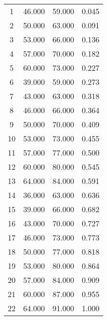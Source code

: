 % 
\begin{tabular}{cccc}
  \hline
  \hline
1 & 46.000 & 59.000 & 0.045 \\ 
  2 & 50.000 & 63.000 & 0.091 \\ 
  3 & 53.000 & 66.000 & 0.136 \\ 
  4 & 57.000 & 70.000 & 0.182 \\ 
  5 & 60.000 & 73.000 & 0.227 \\ 
  6 & 39.000 & 59.000 & 0.273 \\ 
  7 & 43.000 & 63.000 & 0.318 \\ 
  8 & 46.000 & 66.000 & 0.364 \\ 
  9 & 50.000 & 70.000 & 0.409 \\ 
  10 & 53.000 & 73.000 & 0.455 \\ 
  11 & 57.000 & 77.000 & 0.500 \\ 
  12 & 60.000 & 80.000 & 0.545 \\ 
  13 & 64.000 & 84.000 & 0.591 \\ 
  14 & 36.000 & 63.000 & 0.636 \\ 
  15 & 39.000 & 66.000 & 0.682 \\ 
  16 & 43.000 & 70.000 & 0.727 \\ 
  17 & 46.000 & 73.000 & 0.773 \\ 
  18 & 50.000 & 77.000 & 0.818 \\ 
  19 & 53.000 & 80.000 & 0.864 \\ 
  20 & 57.000 & 84.000 & 0.909 \\ 
  21 & 60.000 & 87.000 & 0.955 \\ 
  22 & 64.000 & 91.000 & 1.000 \\ 
   \hline
\end{tabular}
